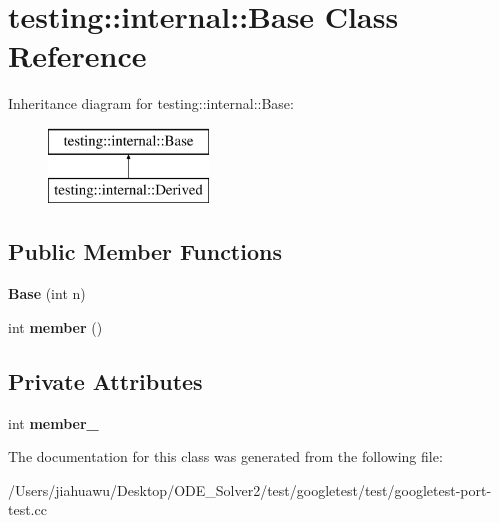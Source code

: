 \hypertarget{classtesting_1_1internal_1_1_base}{}\section{testing\+:\+:internal\+:\+:Base Class Reference}
\label{classtesting_1_1internal_1_1_base}
Inheritance diagram for testing\+:\+:internal\+:\+:Base\+:\begin{figure}[H]
\begin{center}
\leavevmode
\includegraphics[height=2.000000cm]{classtesting_1_1internal_1_1_base}
\end{center}
\end{figure}
\subsection*{Public Member Functions}
\begin{DoxyCompactItemize}
\item 
\mbox{\label{classtesting_1_1internal_1_1_base_a255d105410a1eeb5f4690c9c8cd8e104}} 
{\bfseries Base} (int n)
\item 
\mbox{\label{classtesting_1_1internal_1_1_base_a7ddba6221b56613be545544b7ef6214c}} 
int {\bfseries member} ()
\end{DoxyCompactItemize}
\subsection*{Private Attributes}
\begin{DoxyCompactItemize}
\item 
\mbox{\label{classtesting_1_1internal_1_1_base_ae5ef293660377de27d63ad79b35d2e81}} 
int {\bfseries member\+\_\+}
\end{DoxyCompactItemize}


The documentation for this class was generated from the following file\+:\begin{DoxyCompactItemize}
\item 
/\+Users/jiahuawu/\+Desktop/\+O\+D\+E\+\_\+\+Solver2/test/googletest/test/googletest-\/port-\/test.\+cc\end{DoxyCompactItemize}
